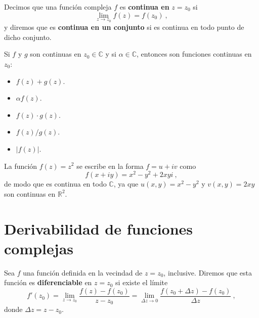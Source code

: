 \begin{defi} 
    Decimos que una función compleja $f$ es \textbf{continua en} $z = z_0$ si 
    \begin{equation*}
        \lim_{z \to z_0} f(z) = f(z_0) \ ,
    \end{equation*}
    y diremos que es \textbf{continua en un conjunto} si es continua en todo punto de dicho conjunto.
\end{defi}

\begin{corolario}
    Si $f$ y $g$ son continuas en $z_0 \in \mathbb{C}$ y si $\alpha \in \mathbb{C}$, entonces son funciones continuas en $z_0$:
    \begin{itemize}
        \item $f(z) + g(z)$.
        \item $\alpha f(z)$.
        \item $f(z) \cdot g(z)$.
        \item $f(z) / g(z)$.
        \item $|f(z)|$.
    \end{itemize} 
\end{corolario}

\begin{ejemplo}
    La función $f(z) = z^2$ se escribe en la forma $f = u + iv$ como
    \begin{equation*}
        f(x+iy) = x^2 - y^2 + 2xyi \ ,
    \end{equation*}
    de modo que es continua en todo $\mathbb{C}$, ya que $u(x,y) = x^2 - y^2$ y $v(x,y) = 2xy$ son continuas en $\mathbb{R}^2$.
\end{ejemplo}


\section{Derivabilidad de funciones complejas}

\begin{defi} 
    Sea $f$ una función definida en la vecindad de $z = z_0$, inclusive. Diremos que esta función es \textbf{diferenciable} en $z = z_0$ si existe el límite
    \begin{equation}
        f'(z_0) = \lim_{z \to z_0} \frac{f(z) - f(z_0)}{z - z_0} = \lim_{\Delta z \to 0} \frac{f(z_0 + \Delta z) - f(z_0)}{\Delta z} \ ,
    \end{equation}
    donde $\Delta z = z - z_0$.
\end{defi}

